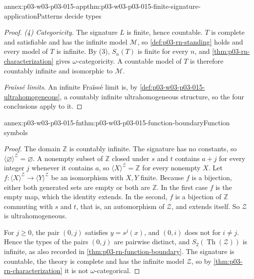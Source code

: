 \begin{annexitem}{annex:p03-w03-p03-015-app}{thm:p03-w03-p03-015-finite-signature-application}{Patterns decide types}
\begin{proof}
\emph{(4) Categoricity.} The signature \(L\) is finite, hence countable.
\(T\) is complete and satisfiable and has the infinite model
\(\mathcal M\), so \cref{def:p03-rn-standing} holds and every model of
\(T\) is infinite. By (3), \(S_n(T)\) is finite for every \(n\), and
\cref{thm:p03-rn-characterization} gives \(\omega\)-categoricity. A
countable model of \(T\) is therefore countably infinite and isomorphic
to \(\mathcal M\).

\emph{Fra\"iss\'e limits.} An infinite Fra\"iss\'e limit is, by
\cref{def:p03-w03-p03-015-ultrahomogeneous}, a countably infinite
ultrahomogeneous structure, so the four conclusions apply to it.
\end{proof}
\end{annexitem}

\begin{annexitem}{annex:p03-w03-p03-015-fn}{thm:p03-w03-p03-015-function-boundary}{Function symbols}
\begin{proof}
The domain \(\mathbb Z\) is countably infinite. The signature has no
constants, so \(\langle\varnothing\rangle^{\mathcal Z}=\varnothing\). A
nonempty subset of \(\mathbb Z\) closed under \(s\) and \(t\) contains
\(a+j\) for every integer \(j\) whenever it contains \(a\), so
\(\langle X\rangle^{\mathcal Z}=\mathbb Z\) for every nonempty \(X\).
Let \(f:\langle X\rangle^{\mathcal Z}\to\langle Y\rangle^{\mathcal Z}\)
be an isomorphism with \(X,Y\) finite. Because \(f\) is a bijection,
either both generated sets are empty or both are \(\mathbb Z\). In the
first case \(f\) is the empty map, which the identity extends. In the
second, \(f\) is a bijection of \(\mathbb Z\) commuting with \(s\) and
\(t\), that is, an automorphism of \(\mathcal Z\), and extends itself.
So \(\mathcal Z\) is ultrahomogeneous.

For \(j\geq0\), the pair \((0,j)\) satisfies \(y=s^j(x)\), and
\((0,i)\) does not for \(i\neq j\). Hence the types of the pairs
\((0,j)\) are pairwise distinct, and \(S_2(\operatorname{Th}(\mathcal Z))\)
is infinite, as also recorded in \cref{thm:p03-rn-function-boundary}.
The signature is countable, the theory is complete and has the infinite
model \(\mathcal Z\), so by \cref{thm:p03-rn-characterization} it is not
\(\omega\)-categorical.
\end{proof}
\end{annexitem}

